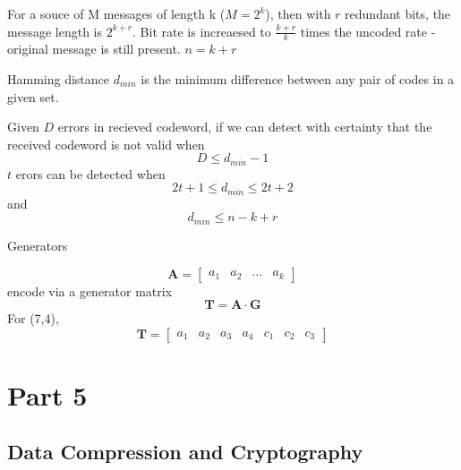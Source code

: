 \documentclass[a4paper,twocolumn]{article}
\begin{document}
				For a souce of M messages of length k ($M=2^k$), then with $r$ redundant bits, the message length is $2^{k+r}$. Bit rate is increaesed to $\frac{k+r}{k}$ times the uncoded rate - original message is still present. $n=k+r$

				Hamming distance $d_{min}$ is the minimum difference between any pair of codes in a given set.

				Given $D$ errors in recieved codeword, if we can detect with certainty that the received codeword is not valid when
				\begin{equation}
					D \le d_{min} -1
				\end{equation}
				 $t$ erors can be detected when
				 \begin{equation}
				 	2t+1 \le d_{min} \le 2t+2
				 \end{equation}
				 and
				 \begin{equation}
				 	d_{min} \le n-k+r
				 \end{equation}

				 Generators

				 \begin{equation}
				 	\mathbf{A} = \begin{bmatrix} a_1 & a_2 & \ldots & a_k \end{bmatrix}
				 \end{equation}
				 encode via a generator matrix
				 \begin{equation}
				 	\mathbf{T} = \mathbf{A} \cdot \mathbf{G}
				 \end{equation}
				 For (7,4),
				 \begin{equation}
				 	\mathbf{T} = \begin{bmatrix} a_1 & a_2 & a_3& a_4 & c_1& c_2& c_3\end{bmatrix}
				 \end{equation}


\section{Part 5}
\subsection{Data Compression and Cryptography}
\end{document}
